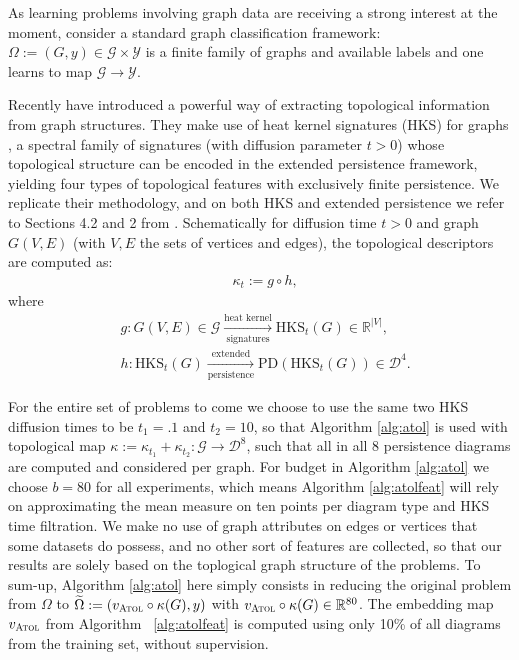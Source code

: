 \documentclass[twoside]{article}
\begin{document}
As learning problems involving graph data are receiving a strong interest at the moment, consider a standard graph classification framework: $\Omega := (G, y) \in \mathcal{G} \times \mathcal{Y}$ is a finite family of graphs and available labels and one learns to map $\mathcal{G} \rightarrow \mathcal{Y}$.

Recently \cite{perslay} have introduced a powerful way of extracting topological information from graph structures. They make use of heat kernel signatures (HKS) for graphs \cite{hu2014stable}, a spectral family of signatures (with diffusion parameter $t > 0$) whose topological structure can be encoded in the extended persistence framework, yielding four types of topological features with exclusively finite persistence. We replicate their methodology, and on both HKS and extended persistence we refer to Sections 4.2 and 2 from \cite{perslay}. Schematically for diffusion time $t>0$ and graph $G(V, E)$ (with $V, E$ the sets of vertices and edges), the topological descriptors are computed as:
\begin{align}
\label{eq:graphpds} &\kappa_t := g \circ h,
\end{align}
where
\begin{align}
	&g : G(V, E) \in \mathcal{G} \xrightarrow[\text{signatures}]{\text{heat kernel}} \text{HKS}_{t}(G) \in \mathbb{R}^{|V|}, \\
	&h : \text{HKS}_{t}(G) \xrightarrow[\text{persistence}]{\text{extended}} \text{PD}(\text{HKS}_{t}(G)) \in \mathcal{D}^{4}.
\end{align}

For the entire set of problems to come we choose to use the same two HKS diffusion times to be $t_1=.1$ and $t_2=10$, so that Algorithm \ref{alg:atol} is used with topological map $\kappa := \kappa_{t_1} + \kappa_{t_2} : \mathcal{G} \rightarrow \mathcal{D}^8$, such that all in all 8 persistence diagrams are computed and considered per graph. For budget in Algorithm \ref{alg:atol} we choose $b=80$ for all experiments, which means Algorithm \ref{alg:atolfeat} will rely on approximating the mean measure on ten points per diagram type and HKS time filtration. We make no use of graph attributes on edges or vertices that some datasets do possess, and no other sort of features are collected, so that our results are solely based on the toplogical graph structure of the problems. To sum-up, Algorithm \ref{alg:atol} here simply consists in reducing the original problem from $\Omega$ to $\widetilde{\Omega} := (v_{\textsc{Atol}}\circ \kappa(G), y)$ with $v_{\textsc{Atol}}\circ \kappa(G) \in \mathbb{R}^{80}$. The embedding map $v_{\textsc{Atol}}$ from Algorithm ~\ref{alg:atolfeat} is computed using only 10\% of all diagrams from the training set, without supervision.
\end{document}
